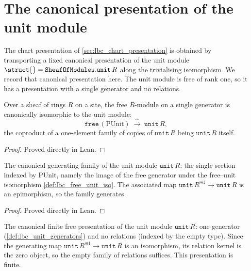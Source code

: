 \section{The canonical presentation of the unit module}
\label{sec:lbc_unit_presentation}

The chart presentation of \cref{sec:lbc_chart_presentation} is obtained by
transporting a fixed canonical presentation of the unit module
\(\struct{} = \mathtt{SheafOfModules.unit}\,R\) along the trivialising
isomorphism. We record that canonical presentation here. The unit module is free
of rank one, so it has a presentation with a single generator and no relations.

\begin{definition}\leanok
  \label{def:lbc_free_unit_iso}
  Over a sheaf of rings \(R\) on a site, the free \(R\)-module on a single
  generator is canonically isomorphic to the unit module:
  \[
    \mathtt{free}\,(\mathrm{PUnit}) \;\xrightarrow{\ \sim\ }\; \mathtt{unit}\,R,
  \]
  the coproduct of a one-element family of copies of \(\mathtt{unit}\,R\) being
  \(\mathtt{unit}\,R\) itself.
\end{definition}

\begin{proof}

\leanok
  Proved directly in Lean.
\end{proof}

\begin{definition}\leanok
  \label{def:lbc_unit_generators}
  The canonical generating family of the unit module \(\mathtt{unit}\,R\): the
  single section indexed by \(\mathrm{PUnit}\), namely the image of the free
  generator under the free–unit isomorphism \cref{def:lbc_free_unit_iso}. The
  associated map \(\mathtt{unit}\,R^{\oplus 1} \to \mathtt{unit}\,R\) is an
  epimorphism, so the family generates.
\end{definition}

\begin{proof}

\leanok
  Proved directly in Lean.
\end{proof}

\begin{definition}\leanok
  \label{def:lbc_unit_presentation}
  The canonical finite free presentation of the unit module \(\mathtt{unit}\,R\):
  one generator (\cref{def:lbc_unit_generators}) and no relations (indexed by the
  empty type). Since the generating map \(\mathtt{unit}\,R^{\oplus 1} \to
  \mathtt{unit}\,R\) is an isomorphism, its relation kernel is the zero object,
  so the empty family of relations suffices. This presentation is finite.
\end{definition}

